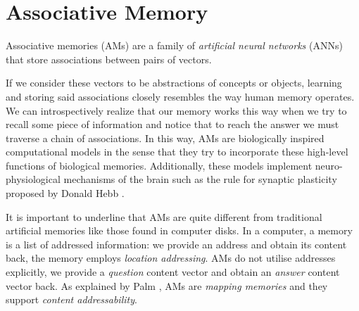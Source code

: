 \documentclass{article}
\begin{document}
\section{Associative Memory}
Associative memories (AMs) are a family of \textit{artificial neural networks} (ANNs) that store associations between pairs of vectors.

If we consider these vectors to be abstractions of concepts or objects, learning and storing said associations closely resembles the way human memory operates. We can introspectively realize that our memory works this way when we try to recall some piece of information and notice that to reach the answer we must traverse a chain of associations. In this way, AMs are biologically inspired computational models in the sense that they try to incorporate these high-level functions of biological memories. Additionally, these models implement neuro-physiological mechanisms of the brain such as the rule for synaptic plasticity proposed by Donald Hebb \cite{hebb2005organization}.

It is important to underline that AMs are quite different from traditional artificial memories like those found in computer disks. In a computer, a memory is a list of addressed information: we provide an address and obtain its content back, the memory employs \textit{location addressing}. AMs do not utilise addresses explicitly, we provide a \textit{question} content vector and obtain an \textit{answer} content vector back.  As explained by Palm \cite{PALM1982145}, AMs are \textit{mapping memories} and they support \textit{content addressability}.
\end{document}
